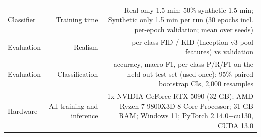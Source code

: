 \begin{table}[t]
\begin{tabular}{lrr}
Classifier & Training time & Real only 1.5 min; 50\% synthetic 1.5 min; Synthetic only 1.5 min per run (30 epochs incl. per-epoch validation; mean over seeds) \\
Evaluation & Realism & per-class FID / KID (Inception-v3 pool features) vs validation \\
Evaluation & Classification & accuracy, macro-F1, per-class P/R/F1 on the held-out test set (used once); 95\% paired bootstrap CIs, 2,000 resamples \\
Hardware & All training and inference & 1x NVIDIA GeForce RTX 5090 (32 GB); AMD Ryzen 7 9800X3D 8-Core Processor; 31 GB RAM; Windows 11; PyTorch 2.14.0+cu130, CUDA 13.0 \\
\bottomrule
\end{tabular}
\end{table}
